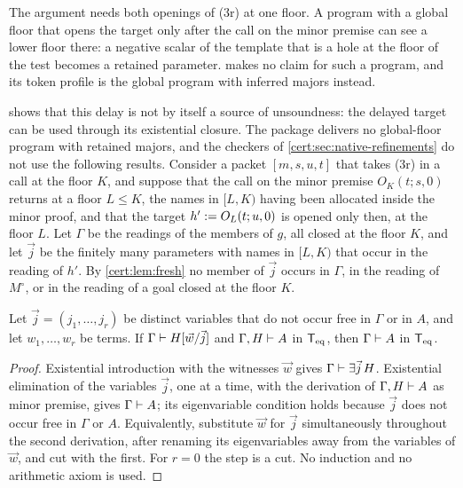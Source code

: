 The argument needs both openings of (3r) at one floor. A program with a
global floor that opens the target only after the call on the minor premise
can see a lower floor there: a negative scalar of the template that is a hole
at the floor of the test becomes a retained parameter. 
makes no claim for such a program, and its token profile is the global
program with inferred majors instead.

 shows that this delay is not by itself a source of
unsoundness: the delayed target can be used through its existential closure.
The package delivers no global-floor program with retained majors, and the
checkers of \cref{cert:sec:native-refinements} do not use the following
results. Consider a packet $[m,s,u,t]$ that takes (3r) in a call at the floor
$K$, and suppose that the call on the minor premise $O_K(t;s,0)$ returns at a
floor $L\le K$, the names in $[L,K)$ having been allocated inside the minor
proof, and that the target $h'\mathrel{:=} O_L(t;u,0)$ is opened only then, at the
floor $L$. Let $\Gamma$ be the readings of the members of $g$, all closed at
the floor $K$, and let $\vec j$ be the finitely many parameters with names in
$[L,K)$ that occur in the reading of $h'$. By \cref{cert:lem:fresh} no member
of $\vec j$ occurs in $\Gamma$, in the reading of $M^{\circ}$, or in the
reading of a goal closed at the floor $K$.

\begin{lemma}\label{cert:lem:fresh-supply}
Let $\vec j=(j_1,\dots,j_r)$ be distinct variables that do not occur free in
$\Gamma$ or in $A$, and let $w_1,\dots,w_r$ be terms. If
$\Gamma\vdash H[\vec w/\vec j]$ and $\Gamma,H\vdash A$ in $\mathsf{T}_{\mathrm{eq}}$, then
$\Gamma\vdash A$ in $\mathsf{T}_{\mathrm{eq}}$.
\end{lemma}
\begin{proof}
Existential introduction with the witnesses $\vec w$ gives
$\Gamma\vdash\exists\vec j\,H$. Existential elimination of the variables
$\vec j$, one at a time, with the derivation of $\Gamma,H\vdash A$ as minor
premise, gives $\Gamma\vdash A$; its eigenvariable condition holds because
$\vec j$ does not occur free in $\Gamma$ or $A$. Equivalently, substitute
$\vec w$ for $\vec j$ simultaneously throughout the second derivation, after
renaming its eigenvariables away from the variables of $\vec w$, and cut with
the first. For $r=0$ the step is a cut. No induction and no arithmetic axiom is
used.
\end{proof}

